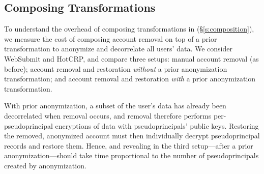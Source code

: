 %
%
%

\subsection{Composing \Xxing Transformations}
\label{s:eval-composition}

%
To understand the overhead of composing transformations in \sys (\S\ref{s:composition}), we measure the
cost of composing account removal on top of
a prior \xxing transformation to anonymize and decorrelate all users' data.
%
We consider WebSubmit and HotCRP, and compare three setups: \one{} manual
account removal (as before); \two{} account removal and restoration
\emph{without} a prior anonymization \xxing transformation; and \three{} account
removal and restoration \emph{with} a prior anonymization \xxing transformation.
%

%
With prior anonymization, a subset of the user's data has already been
decorrelated when removal occurs, and removal therefore performs
per-pseudoprincipal encryptions of \xxed data with pseudoprincipals' public
keys. 
%
%
Restoring the removed, anonymized account must then individually decrypt
pseudoprincipal records and restore them.
%
Hence, \xxing and revealing in the third setup---after a prior
anonymization---should take time proportional to the number of pseudoprincipals
created by anonymization.
%


